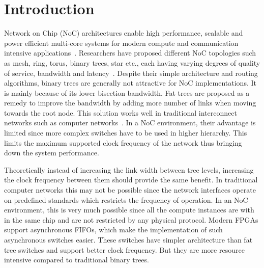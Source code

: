 \section{Introduction}
Network on Chip (NoC) architectures enable high performance, scalable and power efficient multi-core systems for modern compute and communication intensive applications~\cite{Joshi2007,Neeb2005}.
Researchers have proposed different NoC topologies such as mesh, ring, torus, binary trees, star etc., each having varying degrees of quality of service, bandwidth and latency~\cite{Dally2003,Kumar2002}.
Despite their simple architecture and routing algorithms, binary trees are generally not attractive for NoC implementations.
It is mainly because of its lower bisection bandwidth.
Fat trees are proposed as a remedy to improve the bandwidth by adding more number of links when moving towards the root node.
This solution works well in traditional interconnect networks such as computer networks~\cite{Shainer2011}.
In a NoC environment, their advantage is limited since more complex switches have to be used in higher hierarchy.
This limits the maximum supported clock frequency of the network thus bringing down the system performance. 

Theoretically instead of increasing the link width between tree levels, increasing the clock frequency between them should provide the same benefit.
In traditional computer networks this may not be possible since the network interfaces operate on predefined standards which restricts the frequency of operation.
In an NoC environment, this is very much possible since all the compute instances are with in the same chip and are not restricted by any physical protocol. 
Modern FPGAs support asynchronous FIFOs, which make the implementation of such asynchronous switches easier.
These switches have simpler architecture than fat tree switches and support better clock frequency.
But they are more resource intensive compared to traditional binary trees.

